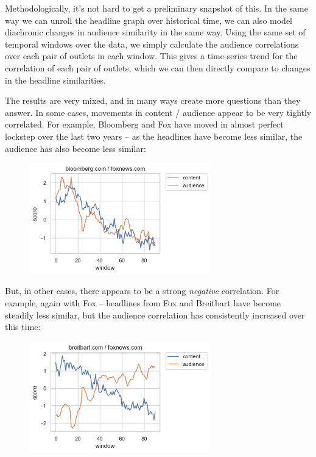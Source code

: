 \documentclass{scrartcl}
\begin{document}
Methodologically, it's not hard to get a preliminary snapshot of this. In the same way we can unroll the headline graph over historical time, we can also model diachronic changes in audience similarity in the same way. Using the same set of temporal windows over the data, we simply calculate the audience correlations over each pair of outlets in each window. This gives a time-series trend for the correlation of each pair of outlets, which we can then directly compare to changes in the headline similarities.

The results are very mixed, and in many ways create more questions than they answer. In some cases, movements in content / audience appear to be very tightly correlated. For example, Bloomberg and Fox have moved in almost perfect lockstep over the last two years -- as the headlines have become less similar, the audience has also become less similar:

\begin{figure}[H]
  \centering
  \includegraphics[width=0.7\textwidth]{figures/bloomberg-fox-corr.png}
\end{figure}

But, in other cases, there appears to be a strong \textit{negative} correlation. For example, again with Fox -- headlines from Fox and Breitbart have become steadily less similar, but the audience correlation has consistently increased over this time:

\begin{figure}[H]
  \centering
  \includegraphics[width=0.7\textwidth]{figures/breitbart-fox-corr.png}
\end{figure}
\end{document}
